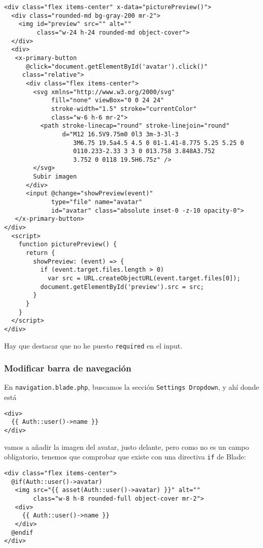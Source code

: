 \documentclass[11pt]{article}
\begin{document}
\begin{verbatim}
<div class="flex items-center" x-data="picturePreview()">
  <div class="rounded-md bg-gray-200 mr-2">
    <img id="preview" src="" alt=""
         class="w-24 h-24 rounded-md object-cover">
  </div>
  <div>
   <x-primary-button
      @click="document.getElementById('avatar').click()"
     class="relative">
      <div class="flex items-center">
        <svg xmlns="http://www.w3.org/2000/svg"
             fill="none" viewBox="0 0 24 24"
             stroke-width="1.5" stroke="currentColor"
             class="w-6 h-6 mr-2">
          <path stroke-linecap="round" stroke-linejoin="round"
                d="M12 16.5V9.75m0 0l3 3m-3-3l-3
                   3M6.75 19.5a4.5 4.5 0 01-1.41-8.775 5.25 5.25 0
                   0110.233-2.33 3 3 0 013.758 3.848A3.752
                   3.752 0 0118 19.5H6.75z" />
        </svg>
        Subir imagen
      </div>
      <input @change="showPreview(event)"
             type="file" name="avatar"
             id="avatar" class="absolute inset-0 -z-10 opacity-0">
   </x-primary-button>
</div>
  <script>
    function picturePreview() {
      return {
        showPreview: (event) => {
          if (event.target.files.length > 0)
            var src = URL.createObjectURL(event.target.files[0]);
          document.getElementById('preview').src = src;
        }
      }
    }
  </script>
</div>
\end{verbatim}
Hay que destacar que no he puesto \texttt{required} en el input.

\subsubsection{Modificar barra de navegación}
\label{sec:org9a9c057}
En \texttt{navigation.blade.php}, buscamos la sección \texttt{Settings Dropdown}, y
ahí donde está
\begin{verbatim}
<div>
  {{ Auth::user()->name }}
</div>
\end{verbatim}

vamos a añadir la imagen del avatar, justo delante, pero como no es un
campo obligatorio, tenemos que comprobar que existe con una directiva
\texttt{if} de Blade:

\begin{verbatim}
<div class="flex items-center">
  @if(Auth::user()->avatar)
   <img src="{{ asset(Auth::user()->avatar) }}" alt=""
        class="w-8 h-8 rounded-full object-cover mr-2">
   <div>
     {{ Auth::user()->name }}
   </div>
  @endif
</div>
\end{verbatim}
\end{document}

